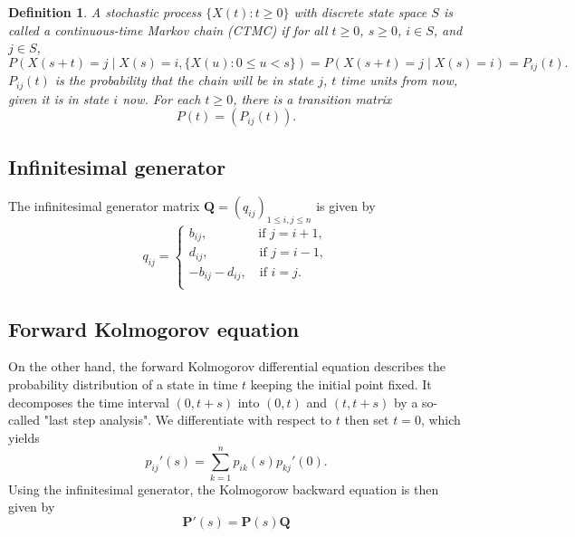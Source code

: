 \documentclass[12pt,a4paper]{article}
\newtheorem{definition}{Definition}
\begin{document}
\begin{definition}
	A stochastic process $\{ X(t) : t \geq 0 \}$ with discrete state space $S$ is called a continuous-time Markov chain (CTMC) if for all $t \geq 0$, $s \geq 0$, $i \in S$, and $j \in S$,
	\[
	P(X(s + t) = j \mid X(s) = i, \{ X(u) : 0 \leq u < s \}) = P(X(s + t) = j \mid X(s) = i) = P_{ij}(t).
	\]
	$P_{ij}(t)$ is the probability that the chain will be in state $j$, $t$ time units from now, given it is in state $i$ now.
	For each $t \geq 0$, there is a transition matrix
	\[
	P(t) = (P_{ij}(t)).
	\]
\end{definition}



\subsection{Infinitesimal generator}
The infinitesimal generator matrix $\bm Q = (q_{ij})_{1\leq i,j\leq n}$ is given by
\begin{equation}
	q_{ij} = 
	\begin{cases}
		b_{ij},\qquad\qquad	\text{if } j=i+1,\\
		d_{ij},	\qquad\qquad \text{if }  j=i-1,\\
		-b_{ij}-d_{ij}, \quad	\text{if } i=j.	\\
	\end{cases}	
\end{equation}


\subsection{Forward Kolmogorov equation}
On the other hand, the forward Kolmogorov differential equation describes the probability distribution of a state
in time $t$ keeping the initial point fixed. 
It decomposes the time interval $(0,t+s)$ into $(0,t)$ and $(t, t+s)$ by a so-called "last step analysis". 
We differentiate with respect to $t$ then set $t=0$, which yields
\begin{equation}
	p_{ij}'(s) = \sum_{k=1}^n p_{ik}(s)p_{kj}'(0).
\end{equation}
Using the infinitesimal generator, the Kolmogorow backward equation is then given by
\begin{equation}
	\bm P'(s) = \bm P(s)\bm Q 
\end{equation}
\end{document}
